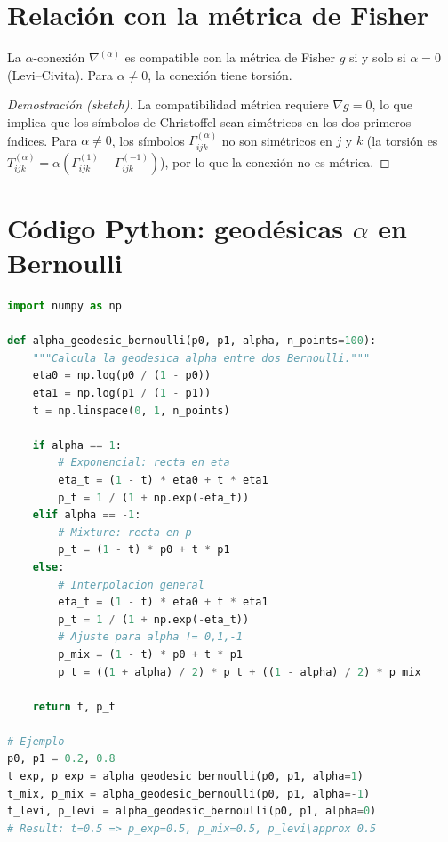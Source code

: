 \section{Relación con la métrica de Fisher}

\begin{theorem}
	La $\alpha$-conexión $\nabla^{(\alpha)}$ es compatible con la métrica de Fisher $g$ si y solo si $\alpha = 0$ (Levi--Civita).  Para $\alpha \ne 0$, la conexión tiene torsión.
\end{theorem}

\begin{proof}[Demostración (sketch)]
	La compatibilidad métrica requiere $\nabla g = 0$, lo que implica que los símbolos de Christoffel sean simétricos en los dos primeros índices.  Para $\alpha \ne 0$, los símbolos $\Gamma^{(\alpha)}_{ijk}$ no son simétricos en $j$ y $k$ (la torsión es $T^{(\alpha)}_{ijk} = \alpha(\Gamma^{(1)}_{ijk} - \Gamma^{(-1)}_{ijk})$), por lo que la conexión no es métrica.
\end{proof}

\section{Código Python: geodésicas $\alpha$ en Bernoulli}

\begin{lstlisting}[language=Python, style=PythonStyle]
import numpy as np

def alpha_geodesic_bernoulli(p0, p1, alpha, n_points=100):
    """Calcula la geodesica alpha entre dos Bernoulli."""
    eta0 = np.log(p0 / (1 - p0))
    eta1 = np.log(p1 / (1 - p1))
    t = np.linspace(0, 1, n_points)
    
    if alpha == 1:
        # Exponencial: recta en eta
        eta_t = (1 - t) * eta0 + t * eta1
        p_t = 1 / (1 + np.exp(-eta_t))
    elif alpha == -1:
        # Mixture: recta en p
        p_t = (1 - t) * p0 + t * p1
    else:
        # Interpolacion general
        eta_t = (1 - t) * eta0 + t * eta1
        p_t = 1 / (1 + np.exp(-eta_t))
        # Ajuste para alpha != 0,1,-1
        p_mix = (1 - t) * p0 + t * p1
        p_t = ((1 + alpha) / 2) * p_t + ((1 - alpha) / 2) * p_mix
    
    return t, p_t

# Ejemplo
p0, p1 = 0.2, 0.8
t_exp, p_exp = alpha_geodesic_bernoulli(p0, p1, alpha=1)
t_mix, p_mix = alpha_geodesic_bernoulli(p0, p1, alpha=-1)
t_levi, p_levi = alpha_geodesic_bernoulli(p0, p1, alpha=0)
# Result: t=0.5 => p_exp=0.5, p_mix=0.5, p_levi\approx 0.5
\end{lstlisting}

